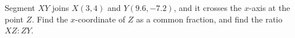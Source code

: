 Segment \(XY\) joins \(X(3,4)\) and \(Y(9.6,-7.2)\), and it crosses the \(x\)-axis at the point \(Z\). Find the \(x\)-coordinate of \(Z\) as a common fraction, and find the ratio \(XZ:ZY\).
